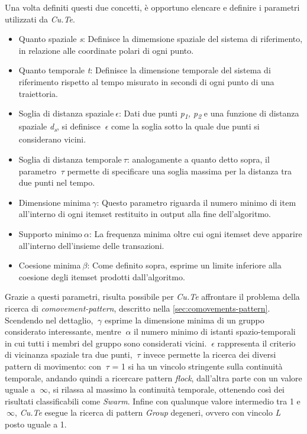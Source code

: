 Una volta definiti questi due concetti, è opportuno elencare e definire i parametri
utilizzati da \textit{Cu.Te}.

\begin{itemize}

  \item Quanto spaziale \textit{s}:
  Definisce la dimemsione spaziale del sistema di riferimento, in relazione alle coordinate polari di ogni punto.

  \item Quanto temporale \textit{t}:
  Definisce la dimensione temporale del sistema di riferimento rispetto al tempo misurato in secondi di ogni punto di una traiettoria.
  \item Soglia di distanza spaziale\(~\epsilon \):
  Dati due punti \textit{p\textsubscript{1}, p\textsubscript{2}} e una funzione di distanza spaziale \textit{d\textsubscript{s}},
  si definisce \(~\epsilon \) come la soglia sotto la quale due punti si considerano vicini.
  \item Soglia di distanza temporale\(~\tau \): analogamente a quanto detto sopra, il parametro \(~\tau \) permette di specificare
  una soglia massima per la distanza tra due punti nel tempo.
  \item Dimensione minima\(~\gamma \): Questo parametro riguarda il numero minimo di item all'interno di ogni itemset restituito in output alla fine dell'algoritmo.
  \item Supporto minimo\(~\alpha \): La frequenza minima oltre cui ogni itemset deve apparire all'interno dell'insieme delle transazioni.
  \item Coesione minima\(~\beta \): Come definito sopra, esprime un limite inferiore alla coesione degli itemset prodotti dall'algoritmo.

\end{itemize}

Grazie a questi parametri, risulta possibile per \textit{Cu.Te} affrontare il problema
della ricerca di \textit{comovement-pattern}, descritto nella \cref{sec:comovements-pattern}.
Scendendo nel dettaglio, \(~\gamma \) esprime la dimensione minima di un gruppo considerato interessante, mentre
\(~\alpha \) il numero minimo di istanti spazio-temporali in cui tutti i membri del gruppo sono considerati vicini.
\(~\epsilon \) rappresenta il criterio di vicinanza spaziale tra due punti, \(~\tau \) invece permette la ricerca dei diversi pattern di movimento:
con \(~\tau \) = 1 si ha un vincolo stringente sulla continuità temporale, andando quindi a ricercare pattern \textit{flock},
dall'altra parte con un valore uguale a \(~\infty \), si rilassa al massimo la continuità temporale, ottenendo
così dei risultati classificabili come \textit{Swarm}. Infine con qualunque valore intermedio tra 1 e  \(~\infty \),
\textit{Cu.Te} esegue la ricerca di pattern \textit{Group} degeneri, ovvero con vincolo \textit{L} posto uguale a 1.


